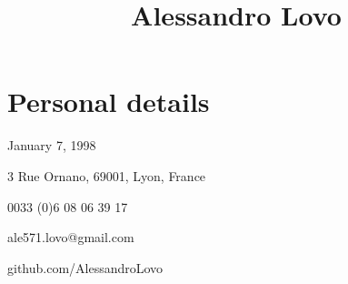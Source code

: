 \documentclass[11pt, a4 paper]{article}
\begin{document}
\title{Alessandro Lovo}
\date{}
\author{}
\maketitle


\section*{Personal details}
  \begin{multicols}{2}
    \begin{description}[style=multiline,leftmargin=2cm,align=right]
      \item[birth] January 7, 1998
      \item[address] 3 Rue Ornano, 69001, Lyon, France
      \item[phone] 0033 (0)6 08 06 39 17
      \item[e-mail] ale571.lovo@gmail.com

      \item[GitHub] github.com/AlessandroLovo
    \end{description}
  \end{multicols}
\end{document}
